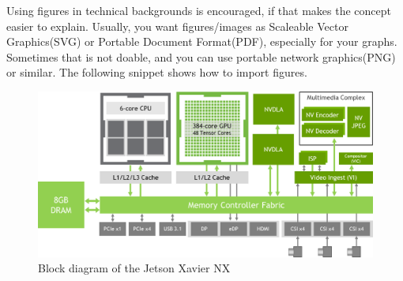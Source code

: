 \documentclass[conference]{IEEEtran}
\begin{document}
\bigskip

Using figures in technical backgrounds is encouraged, if that makes the concept easier to explain. Usually, you want figures/images as Scaleable Vector Graphics(SVG) or Portable Document Format(PDF), especially for your graphs. Sometimes that is not doable, and you can use portable network graphics(PNG) or similar.
The following snippet shows how to import figures.

\begin{figure}[htbp]
	\centering
	\includegraphics[scale=0.75]{figures/jetson_nx.png}
	\caption{Block diagram of the Jetson Xavier NX}
	\label{fig:block_diagram}
\end{figure}

\end{document}
